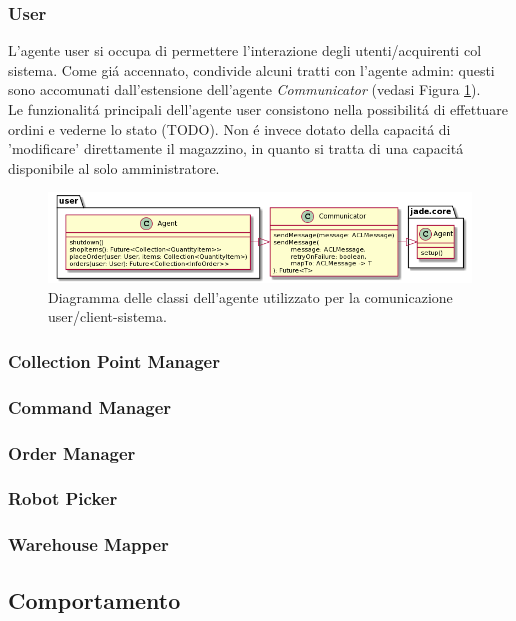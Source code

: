 \subsubsection{User}
L'agente user si occupa di permettere l'interazione degli utenti/acquirenti col sistema. Come gi\'a accennato, condivide alcuni tratti con l'agente admin: questi sono accomunati dall'estensione dell'agente \textit{Communicator} (vedasi Figura \ref{fig:class_diagram_user_agent}).\\
Le funzionalit\'a principali dell'agente user consistono nella possibilit\'a di effettuare ordini e vederne lo stato (TODO). Non \'e invece dotato della capacit\'a di 'modificare' direttamente il magazzino, in quanto si tratta di una capacit\'a disponibile al solo amministratore.
\begin{figure}[ht]
    \includegraphics[width=\textwidth]{section/design/figure/user/class_diagram.png}
    \caption{Diagramma delle classi dell'agente utilizzato per la comunicazione user/client-sistema.}
    \label{fig:class_diagram_user_agent}
\end{figure}

\subsubsection{Collection Point Manager}
\subsubsection{Command Manager}
\subsubsection{Order Manager}
\subsubsection{Robot Picker}
\subsubsection{Warehouse Mapper}

\subsection{Comportamento}

